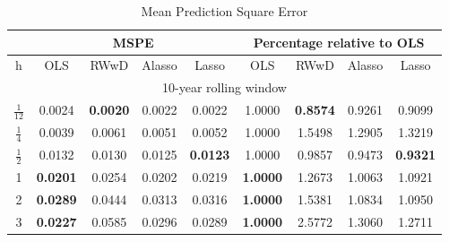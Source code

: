 \documentclass[12pt,a4paper]{article}
\begin{document}
\begin{table}[]\center \small
\caption{Mean Prediction Square Error}
\label{tab:5}
\begin{tabular}{ccccccccc}
\hline
\multicolumn{1}{|c|}{}                 & \multicolumn{4}{c|}{MSPE}                                                                  & \multicolumn{4}{c|}{Percentage relative to OLS}                                            \\ \hline
\multicolumn{1}{|c|}{h}                & OLS             & RWwD            & Alasso          & \multicolumn{1}{c|}{Lasso}           & OLS             & RWwD            & Alasso          & \multicolumn{1}{c|}{Lasso}           \\ \hline
\multicolumn{9}{|c|}{10-year rolling window}                                                                                                                                                                                     \\ \hline
\multicolumn{1}{|c|}{$ \frac{1}{12} $} & 0.0024          & \textbf{0.0020} & 0.0022          & \multicolumn{1}{c|}{0.0022}          & 1.0000          & \textbf{0.8574} & 0.9261          & \multicolumn{1}{c|}{0.9099}          \\
\multicolumn{1}{|c|}{$ \frac{1}{4} $}  & 0.0039          & 0.0061          & 0.0051          & \multicolumn{1}{c|}{0.0052}          & 1.0000          & 1.5498          & 1.2905          & \multicolumn{1}{c|}{1.3219}          \\
\multicolumn{1}{|c|}{$ \frac{1}{2} $}  & 0.0132          & 0.0130          & 0.0125          & \multicolumn{1}{c|}{\textbf{0.0123}} & 1.0000          & 0.9857          & 0.9473          & \multicolumn{1}{c|}{\textbf{0.9321}} \\
\multicolumn{1}{|c|}{1}                & \textbf{0.0201} & 0.0254          & 0.0202          & \multicolumn{1}{c|}{0.0219}          & \textbf{1.0000} & 1.2673          & 1.0063          & \multicolumn{1}{c|}{1.0921}          \\
\multicolumn{1}{|c|}{2}                & \textbf{0.0289} & 0.0444          & 0.0313          & \multicolumn{1}{c|}{0.0316}          & \textbf{1.0000} & 1.5381          & 1.0834          & \multicolumn{1}{c|}{1.0950}          \\
\multicolumn{1}{|c|}{3}                & \textbf{0.0227} & 0.0585          & 0.0296          & \multicolumn{1}{c|}{0.0289}          & \textbf{1.0000} & 2.5772          & 1.3060          & \multicolumn{1}{c|}{1.2711}          \\ \hline

\end{tabular}
\end{table}
\end{document}
